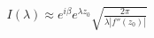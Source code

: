 \documentclass[preview]{standalone}
\begin{document}
\begin{align*}
I(\lambda) \approx e^{i\beta} e^{\lambda z_0} \sqrt{\frac{2\pi}{\lambda |f''(z_0)|}}
\end{align*}
\end{document}
